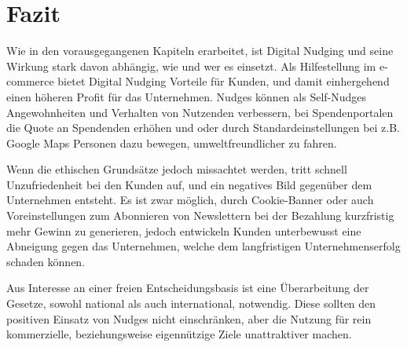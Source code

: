 \chapter{Fazit}
Wie in den vorausgegangenen Kapiteln erarbeitet, ist Digital Nudging und seine Wirkung stark davon abhängig, wie und wer es einsetzt. Als Hilfestellung im e-commerce bietet Digital Nudging Vorteile für Kunden, und damit einhergehend einen höheren Profit für das Unternehmen. Nudges können als Self-Nudges Angewohnheiten und Verhalten von Nutzenden verbessern, bei Spendenportalen die Quote an Spendenden erhöhen und oder durch Standardeinstellungen bei z.B. Google Maps Personen dazu bewegen, umweltfreundlicher zu fahren.

Wenn die ethischen Grundsätze jedoch missachtet werden, tritt schnell Unzufriedenheit bei den Kunden auf, und ein negatives Bild gegenüber dem Unternehmen entsteht. Es ist zwar möglich, durch Cookie-Banner oder auch Voreinstellungen zum Abonnieren von Newslettern bei der Bezahlung kurzfristig mehr Gewinn zu generieren, jedoch entwickeln Kunden unterbewusst eine Abneigung gegen das Unternehmen, welche dem langfristigen Unternehmenserfolg schaden können.

Aus Interesse an einer freien Entscheidungsbasis ist eine Überarbeitung der Gesetze, sowohl national als auch international, notwendig. Diese sollten den positiven Einsatz von Nudges nicht einschränken, aber die Nutzung für rein kommerzielle, beziehungsweise eigennützige Ziele unattraktiver machen.